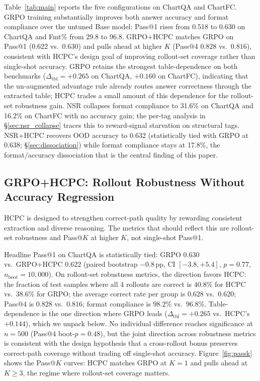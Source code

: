 \documentclass[11pt]{article}
\begin{document}
Table~\ref{tab:main} reports the five configurations on ChartQA and
ChartFC. GRPO training substantially improves both answer accuracy
and format compliance over the untuned Base model: Pass@1 rises from
0.518 to 0.630 on ChartQA and Fmt\% from 29.8 to 96.8.
\textsc{GRPO+HCPC} matches \textsc{GRPO} on Pass@1 (0.622 vs.\
0.630) and pulls ahead at higher $K$ (Pass@4 $0.828$ vs.\ $0.816$),
consistent with HCPC's design goal of improving rollout-set
coverage rather than single-shot accuracy. \textsc{GRPO} retains
the strongest table-dependence on both benchmarks
($\Delta_{\text{tbl}}{=}{+}0.265$ on ChartQA, $+0.160$ on ChartFC),
indicating that the un-augmented advantage rule already routes
answer correctness through the extracted table; HCPC trades a small
amount of this dependence for the rollout-set robustness gain. \textsc{NSR} collapses format compliance to
31.6\% on ChartQA and 16.2\% on ChartFC with no accuracy gain; the
per-tag analysis in \S\ref{sec:nsr_collapse} traces this to
reward-signal starvation on structural tags. \textsc{NSR+HCPC}
recovers OOD accuracy to 0.632 (statistically tied with GRPO at
0.638; \S\ref{sec:dissociation}) while format compliance stays at
17.8\%, the format/accuracy dissociation that is the central finding
of this paper.

\subsection{GRPO+HCPC: Rollout Robustness Without Accuracy Regression}
\label{sec:hcpc_grpo}

HCPC is designed to strengthen correct-path quality by rewarding
consistent extraction and diverse reasoning. The metrics that should
reflect this are rollout-set robustness and Pass@$K$ at higher $K$,
not single-shot Pass@1.

Headline Pass@1 on ChartQA is statistically tied: \textsc{GRPO}
$0.630$ vs.\ \textsc{GRPO+HCPC} $0.622$ (paired bootstrap
$-0.8$\,pp, CI $[-3.8,+5.4]$, $p{=}0.77$, $n_{\text{boot}}{=}10{,}000$).
On rollout-set robustness metrics, the direction favors HCPC: the
fraction of test samples where all 4 rollouts are correct is
$40.8\%$ for HCPC vs.\ $38.6\%$ for GRPO; the average correct rate
per group is $0.628$ vs.\ $0.620$; Pass@4 is $0.828$ vs.\ $0.816$;
format compliance is $98.2\%$ vs.\ $96.8\%$. Table-dependence is
the one direction where GRPO leads
($\Delta_{\text{tbl}}{=}{+}0.265$ vs.\ HCPC's $+0.144$), which we
unpack below. No individual difference reaches significance at
$n{=}500$ (Pass@4 boot-$p{=}0.48$), but the joint direction across
robustness metrics is consistent with the design hypothesis that a
cross-rollout bonus preserves correct-path coverage without
trading off single-shot accuracy. Figure~\ref{fig:passk} shows the Pass@$K$ curves: HCPC
matches GRPO at $K{=}1$ and pulls ahead at $K{\geq}3$, the regime
where rollout-set coverage matters.
\end{document}
